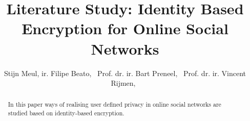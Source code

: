 \documentclass[journal]{IEEEtran}
\begin{document}
%
\title{Literature Study: Identity Based Encryption for Online Social Networks}
%
%
%

\author{Stijn Meul,
        ir. Filipe Beato,~
        Prof. dr. ir. Bart Preneel,~
        Prof. dr. ir. Vincent Rijmen,~%
        }

\markboth{}%
{}
% 

\maketitle

\begin{abstract}
In this paper ways of realising user defined privacy in online social
networks are studied based on identity-based encryption.
\end{abstract}







%
\IEEEpeerreviewmaketitle
\end{document}
